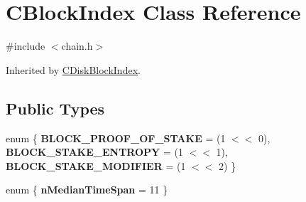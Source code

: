 \hypertarget{class_c_block_index}{}\section{C\+Block\+Index Class Reference}
\label{class_c_block_index}


{\ttfamily \#include $<$chain.\+h$>$}



Inherited by \mbox{\hyperlink{class_c_disk_block_index}{C\+Disk\+Block\+Index}}.

\subsection*{Public Types}
\begin{DoxyCompactItemize}
\item 
\mbox{\label{class_c_block_index_aa518b1ab90f8a0bb1df29da6063d886b}} 
enum \{ {\bfseries B\+L\+O\+C\+K\+\_\+\+P\+R\+O\+O\+F\+\_\+\+O\+F\+\_\+\+S\+T\+A\+KE} = (1 $<$$<$ 0), 
{\bfseries B\+L\+O\+C\+K\+\_\+\+S\+T\+A\+K\+E\+\_\+\+E\+N\+T\+R\+O\+PY} = (1 $<$$<$ 1), 
{\bfseries B\+L\+O\+C\+K\+\_\+\+S\+T\+A\+K\+E\+\_\+\+M\+O\+D\+I\+F\+I\+ER} = (1 $<$$<$ 2)
 \}
\item 
\mbox{\label{class_c_block_index_acefc16035e60d7bd52ed2c9bb1aa838e}} 
enum \{ {\bfseries n\+Median\+Time\+Span} = 11
 \}
\end{DoxyCompactItemize}
